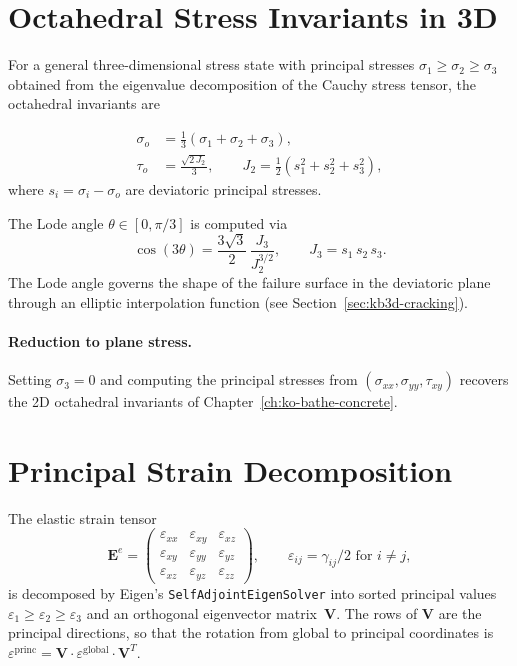 \section{Octahedral Stress Invariants in 3D}
\label{sec:kb3d-octahedral}

For a general three-dimensional stress state with principal stresses
$\sigma_1 \ge \sigma_2 \ge \sigma_3$ obtained from the eigenvalue
decomposition of the Cauchy stress tensor, the octahedral invariants are

\begin{align}
  \sigma_o &= \frac{1}{3}(\sigma_1 + \sigma_2 + \sigma_3), \label{eq:sigma-o-3d} \\[4pt]
  \tau_o   &= \frac{\sqrt{2\,J_2}}{3}, \qquad
  J_2 = \tfrac{1}{2}(s_1^2 + s_2^2 + s_3^2), \label{eq:tau-o-3d}
\end{align}
where $s_i = \sigma_i - \sigma_o$ are deviatoric principal stresses.

The Lode angle $\theta \in [0, \pi/3]$ is computed via
\begin{equation}
  \cos(3\theta) = \frac{3\sqrt{3}}{2}\,\frac{J_3}{J_2^{3/2}},
  \qquad J_3 = s_1\,s_2\,s_3.
  \label{eq:lode-angle}
\end{equation}
The Lode angle governs the shape of the failure surface in the deviatoric
plane through an elliptic interpolation function (see
Section~\ref{sec:kb3d-cracking}).

\paragraph{Reduction to plane stress.}
Setting $\sigma_3 = 0$ and computing the principal stresses from
$(\sigma_{xx}, \sigma_{yy}, \tau_{xy})$ recovers the 2D octahedral invariants
of Chapter~\ref{ch:ko-bathe-concrete}.


\section{Principal Strain Decomposition}
\label{sec:kb3d-principal}

The elastic strain tensor
\[
  \mathbf{E}^e =
  \begin{pmatrix}
    \varepsilon_{xx} & \varepsilon_{xy} & \varepsilon_{xz} \\
    \varepsilon_{xy} & \varepsilon_{yy} & \varepsilon_{yz} \\
    \varepsilon_{xz} & \varepsilon_{yz} & \varepsilon_{zz}
  \end{pmatrix},
  \qquad \varepsilon_{ij} = \gamma_{ij}/2 \text{ for } i \neq j,
\]
is decomposed by Eigen's \texttt{SelfAdjointEigenSolver} into sorted principal
values $\varepsilon_1 \ge \varepsilon_2 \ge \varepsilon_3$ and an orthogonal
eigenvector matrix~$\mathbf{V}$.  The rows of $\mathbf{V}$ are the principal
directions, so that the rotation from global to principal coordinates is
$\varepsilon^{\text{princ}} = \mathbf{V} \cdot \varepsilon^{\text{global}}
 \cdot \mathbf{V}^T$.


